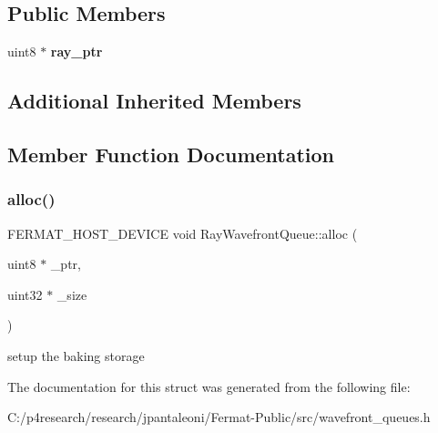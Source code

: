 \subsection*{Public Members}
\begin{DoxyCompactItemize}
\item 
\mbox{\label{struct_ray_wavefront_queue_acb3fa9d67907eeab50aea2dfd7eccef8}} 
uint8 $\ast$ {\bfseries ray\+\_\+ptr}
\end{DoxyCompactItemize}
\subsection*{Additional Inherited Members}


\subsection{Member Function Documentation}
\mbox{\label{struct_ray_wavefront_queue_a65fe540801f6b86491d12288ceeab0af}} 
\subsubsection{\texorpdfstring{alloc()}{alloc()}}
{\footnotesize\ttfamily F\+E\+R\+M\+A\+T\+\_\+\+H\+O\+S\+T\+\_\+\+D\+E\+V\+I\+CE void Ray\+Wavefront\+Queue\+::alloc (\begin{DoxyParamCaption}\item[{uint8 $\ast$}]{\+\_\+ptr,  }\item[{uint32 $\ast$}]{\+\_\+size }\end{DoxyParamCaption})\hspace{0.3cm}{\ttfamily [inline]}}

setup the baking storage 

The documentation for this struct was generated from the following file\+:\begin{DoxyCompactItemize}
\item 
C\+:/p4research/research/jpantaleoni/\+Fermat-\/\+Public/src/wavefront\+\_\+queues.\+h\end{DoxyCompactItemize}
